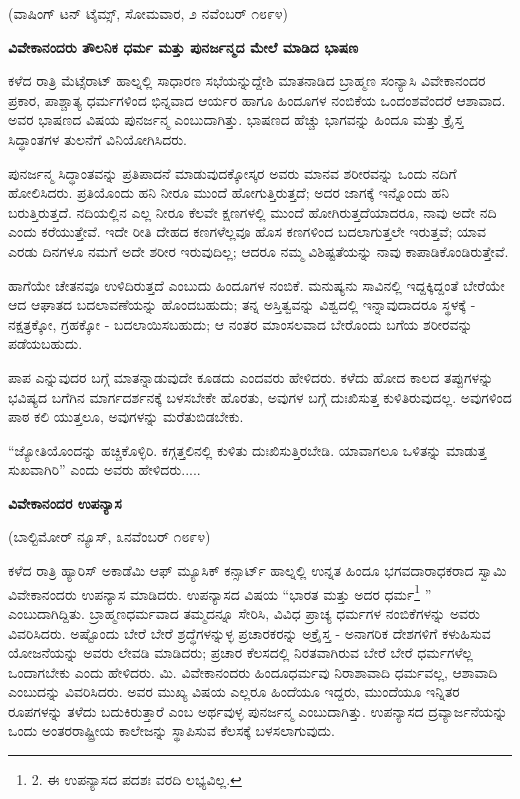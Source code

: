 \begin{center}
(ವಾಷಿಂಗ್ ಟನ್ ಟೈಮ್ಸ್, ಸೋಮವಾರ, ೨ ನವೆಂಬರ್ ೧೮೯೪)
\end{center}

\begin{center}
\textbf{ವಿವೇಕಾನಂದರು ತೌಲನಿಕ ಧರ್ಮ ಮತ್ತು ಪುನರ್ಜನ್ಮದ ಮೇಲೆ ಮಾಡಿದ ಭಾಷಣ}
\end{center}

ಕಳೆದ ರಾತ್ರಿ ಮೆಟ್ಸೆರಾಟ್ ಹಾಲ್ನಲ್ಲಿ ಸಾಧಾರಣ ಸಭೆಯನ್ನುದ್ದೇಶಿ ಮಾತನಾಡಿದ ಬ್ರಾಹ್ಮಣ ಸಂನ್ಯಾಸಿ ವಿವೇಕಾನಂದರ ಪ್ರಕಾರ, ಪಾಶ್ಚಾತ್ಯ ಧರ್ಮಗಳಿಂದ ಭಿನ್ನವಾದ ಆರ್ಯರ ಹಾಗೂ ಹಿಂದೂಗಳ ನಂಬಿಕೆಯ ಒಂದಂಶವೆಂದರೆ ಆಶಾವಾದ. ಅವರ ಭಾಷಣದ ವಿಷಯ ಪುನರ್ಜನ್ಮ ಎಂಬುದಾಗಿತ್ತು. ಭಾಷಣದ ಹೆಚ್ಚು ಭಾಗವನ್ನು ಹಿಂದೂ ಮತ್ತು ಕ್ರೈಸ್ತ ಸಿದ್ಧಾಂತಗಳ ತುಲನೆಗೆ ವಿನಿಯೋಗಿಸಿದರು.

ಪುನರ್ಜನ್ಮ ಸಿದ್ಧಾಂತವನ್ನು ಪ್ರತಿಪಾದನೆ ಮಾಡುವುದಕ್ಕೋಸ್ಕರ ಅವರು ಮಾನವ ಶರೀರವನ್ನು ಒಂದು ನದಿಗೆ ಹೋಲಿಸಿದರು. ಪ್ರತಿಯೊಂದು ಹನಿ ನೀರೂ ಮುಂದೆ ಹೋಗುತ್ತಿರುತ್ತದೆ; ಅದರ ಜಾಗಕ್ಕೆ ಇನ್ನೊಂದು ಹನಿ ಬರುತ್ತಿರುತ್ತದೆ. ನದಿಯಲ್ಲಿನ ಎಲ್ಲ ನೀರೂ ಕೆಲವೇ ಕ್ಷಣಗಳಲ್ಲಿ ಮುಂದೆ ಹೋಗಿರುತ್ತದೆಯಾದರೂ, ನಾವು ಅದೇ ನದಿ ಎಂದು ಕರೆಯುತ್ತೇವೆ. ಇದೇ ರೀತಿ ದೇಹದ ಕಣಗಳೆಲ್ಲವೂ ಹೊಸ ಕಣಗಳಿಂದ ಬದಲಾಗುತ್ತಲೇ ಇರುತ್ತವೆ; ಯಾವ ಎರಡು ದಿನಗಳೂ ನಮಗೆ ಅದೇ ಶರೀರ ಇರುವುದಿಲ್ಲ; ಆದರೂ ನಮ್ಮ ವಿಶಿಷ್ಟತೆಯನ್ನು ನಾವು ಕಾಪಾಡಿಕೊಂಡಿರುತ್ತೇವೆ.

ಹಾಗೆಯೇ ಚೇತನವೂ ಉಳಿದಿರುತ್ತದೆ ಎಂಬುದು ಹಿಂದೂಗಳ ನಂಬಿಕೆ. ಮನುಷ್ಯನು ಸಾವಿನಲ್ಲಿ ಇದ್ದಕ್ಕಿದ್ದಂತೆ ಬೇರೆಯೇ ಆದ ಆಘಾತದ ಬದಲಾವಣೆಯನ್ನು ಹೊಂದಬಹುದು; ತನ್ನ ಅಸ್ತಿತ್ವವನ್ನು ವಿಶ್ವದಲ್ಲಿ ಇನ್ನಾವುದಾದರೂ ಸ್ಥಳಕ್ಕೆ - ನಕ್ಷತ್ರಕ್ಕೋ, ಗ್ರಹಕ್ಕೋ - ಬದಲಾಯಿಸಬಹುದು; ಆ ನಂತರ ಮಾಂಸಲವಾದ ಬೇರೊಂದು ಬಗೆಯ ಶರೀರವನ್ನು ಪಡೆಯಬಹುದು.

ಪಾಪ ಎನ್ನುವುದರ ಬಗ್ಗೆ ಮಾತನ್ನಾಡುವುದೇ ಕೂಡದು ಎಂದವರು ಹೇಳಿದರು. ಕಳೆದು ಹೋದ ಕಾಲದ ತಪ್ಪುಗಳನ್ನು ಭವಿಷ್ಯದ ಬಗೆಗಿನ ಮಾರ್ಗದರ್ಶನಕ್ಕೆ ಬಳಸಬೇಕೇ ಹೊರತು, ಅವುಗಳ ಬಗ್ಗೆ ದುಃಖಿಸುತ್ತ ಕುಳಿತಿರುವುದಲ್ಲ. ಅವುಗಳಿಂದ ಪಾಠ ಕಲಿ ಯುತ್ತಲೂ, ಅವುಗಳನ್ನು ಮರೆತುಬಿಡಬೇಕು.

“ಜ್ಯೋತಿಯೊಂದನ್ನು ಹಚ್ಚಿಕೊಳ್ಳಿರಿ. ಕಗ್ಗತ್ತಲಿನಲ್ಲಿ ಕುಳಿತು ದುಃಖಿಸುತ್ತಿರಬೇಡಿ. ಯಾವಾಗಲೂ ಒಳಿತನ್ನು ಮಾಡುತ್ತ ಸುಖವಾಗಿರಿ” ಎಂದು ಅವರು ಹೇಳಿದರು.....

\begin{center}
\textbf{ವಿವೇಕಾನಂದರ ಉಪನ್ಯಾಸ}
\end{center}

\begin{center}
(ಬಾಲ್ಟಿಮೋರ್ ನ್ಯೂಸ್, ೩ನವೆಂಬರ್ ೧೮೯೪)
\end{center}

ಕಳೆದ ರಾತ್ರಿ ಹ್ಯಾರಿಸ್ ಅಕಾಡೆಮಿ ಆಫ್ ಮ್ಯೂಸಿಕ್ ಕನ್ಸಾರ್ಟ್ ಹಾಲ್ನಲ್ಲಿ ಉನ್ನತ ಹಿಂದೂ ಭಗವದಾರಾಧಕರಾದ ಸ್ವಾಮಿ ವಿವೇಕಾನಂದರು ಉಪನ್ಯಾಸ ಮಾಡಿದರು. ಉಪನ್ಯಾಸದ ವಿಷಯ “ಭಾರತ ಮತ್ತು ಅದರ ಧರ್ಮ\footnote{2. ಈ ಉಪನ್ಯಾಸದ ಪದಶಃ ವರದಿ ಲಭ್ಯವಿಲ್ಲ.} ” ಎಂಬುದಾಗಿದ್ದಿತು. ಬ್ರಾಹ್ಮಣಧರ್ಮವಾದ ತಮ್ಮದನ್ನೂ ಸೇರಿಸಿ, ವಿವಿಧ ಪ್ರಾಚ್ಯ ಧರ್ಮಗಳ ನಂಬಿಕೆಗಳನ್ನು ಅವರು ವಿವರಿಸಿದರು. ಅಷ್ಟೊಂದು ಬೇರೆ ಬೇರೆ ಶ್ರದ್ಧೆಗಳನ್ನುಳ್ಳ ಪ್ರಚಾರಕರನ್ನು ಅಕ್ರೈಸ್ತ - ಅನಾಗರಿಕ ದೇಶಗಳಿಗೆ ಕಳುಹಿಸುವ ಯೋಜನೆಯನ್ನು ಅವರು ಲೇವಡಿ ಮಾಡಿದರು; ಪ್ರಚಾರ ಕೆಲಸದಲ್ಲಿ ನಿರತವಾಗಿರುವ ಬೇರೆ ಬೇರೆ ಧರ್ಮಗಳೆಲ್ಲ ಒಂದಾಗಬೇಕು ಎಂದು ಹೇಳಿದರು. ಮಿ. ವಿವೇಕಾನಂದರು ಹಿಂದೂಧರ್ಮವು ನಿರಾಶಾವಾದಿ ಧರ್ಮವಲ್ಲ, ಆಶಾವಾದಿ ಎಂಬುದನ್ನು ವಿವರಿಸಿದರು. ಅವರ ಮುಖ್ಯ ವಿಷಯ ಎಲ್ಲರೂ ಹಿಂದೆಯೂ ಇದ್ದರು, ಮುಂದೆಯೂ ಇನ್ನಿತರ ರೂಪಗಳನ್ನು ತಳೆದು ಬದುಕಿರುತ್ತಾರೆ ಎಂಬ ಅರ್ಥವುಳ್ಳ ಪುನರ್ಜನ್ಮ ಎಂಬುದಾಗಿತ್ತು. ಉಪನ್ಯಾಸದ ದ್ರವ್ಯಾರ್ಜನೆಯನ್ನು ಒಂದು ಅಂತರರಾಷ್ಟ್ರೀಯ ಕಾಲೇಜನ್ನು ಸ್ಥಾಪಿಸುವ ಕೆಲಸಕ್ಕೆ ಬಳಸಲಾಗುವುದು.


